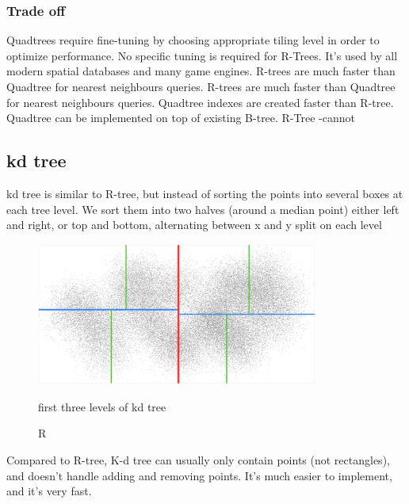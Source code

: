 \documentclass[paper=letter, fontsize=12pt]{article}
\begin{document}
\subsubsection{Trade off}
	\begin{itemize}
		\tick Quadtrees require fine-tuning by choosing appropriate tiling level in order to optimize performance. No specific tuning is required for R-Trees.
		\tick It’s used by all modern spatial databases and many game engines. 
		\tick R-trees are much faster than Quadtree for nearest neighbours queries.
		\tick R-trees are much faster than Quadtree for nearest neighbours queries.
		\fail Quadtree indexes are created faster than R-tree.
		\fail Quadtree can be implemented on top of existing B-tree. R-Tree -cannot
	\end{itemize}

\subsection{kd tree}
kd tree is similar to R-tree, but instead of sorting the points into several boxes at each tree level.
We sort them into two halves (around a median point) either left and right, or top and bottom, alternating between x and y split on each level
\begin{figure}[htbp]
	\centering
	\includegraphics[width=350px]{assets/kd-tree}
	\caption{first three levels of kd tree}
	\caption{R}
\end{figure}
\begin{itemize}
	\fail Compared to R-tree, K-d tree can usually only contain points (not rectangles), and doesn’t handle adding and removing points. 
	\tick It’s much easier to implement, and it’s very fast.
\end{itemize}
\end{document}
